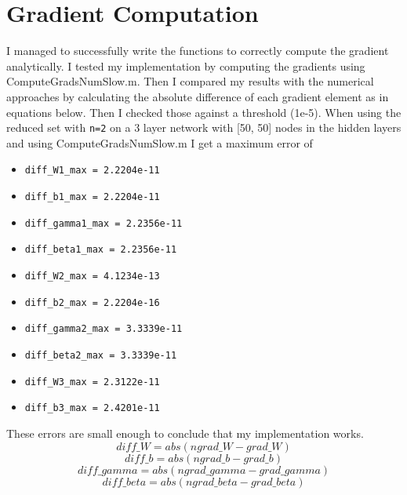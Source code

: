 \section{Gradient Computation}
I managed to successfully write the functions to correctly compute the gradient analytically.
I tested my implementation by computing the gradients using ComputeGradsNumSlow.m.
Then I compared my results with the numerical approaches by calculating the absolute difference of each gradient element as in equations below.
Then I checked those against a threshold (1e-5). 
When using the reduced set with \texttt{n=2} on a 3 layer network with [50, 50] nodes in the hidden layers and using ComputeGradsNumSlow.m 
I get a maximum error of 
\begin{itemize}
    \item \texttt{diff\_W1\_max = 2.2204e-11}
    \item \texttt{diff\_b1\_max = 2.2204e-11}
    \item \texttt{diff\_gamma1\_max = 2.2356e-11}
    \item \texttt{diff\_beta1\_max = 2.2356e-11}
    \item \texttt{diff\_W2\_max = 4.1234e-13}
    \item \texttt{diff\_b2\_max = 2.2204e-16}
    \item \texttt{diff\_gamma2\_max = 3.3339e-11}
    \item \texttt{diff\_beta2\_max = 3.3339e-11}
    \item \texttt{diff\_W3\_max = 2.3122e-11}
    \item \texttt{diff\_b3\_max = 2.4201e-11}

\end{itemize}
These errors are small enough to conclude that my implementation works. \\ 
\begin{equation}\label{eq:diffw}
    diff\_W = abs(ngrad\_W - grad\_W)
\end{equation}
\begin{equation}\label{eq:diffb}
    diff\_b = abs(ngrad\_b - grad\_b)
\end{equation}
\begin{equation}\label{eq:diffgamma}
    diff\_gamma = abs(ngrad\_gamma - grad\_gamma)
\end{equation}
\begin{equation}\label{eq:diffbeta}
    diff\_beta = abs(ngrad\_beta - grad\_beta)
\end{equation}

